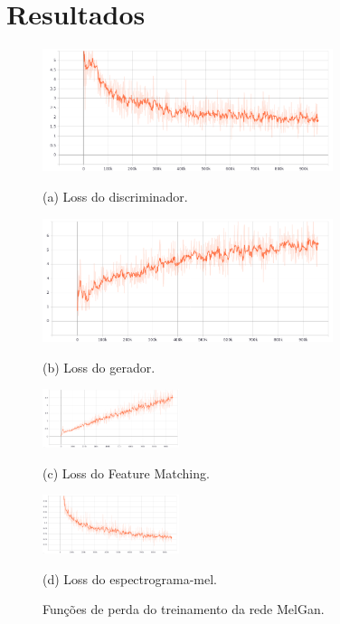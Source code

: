 \documentclass{article}
\begin{document}
\section{Resultados}
\label{sec:pagestyle}

\begin{figure}[H]
	
	\begin{minipage}[b]{1.0\linewidth}
		\centering
		\centerline{\includegraphics[width=8.5cm]{Figures/discriminator_loss.png}}
		\centerline{(a) Loss do discriminador.}\medskip
	\end{minipage}
	\begin{minipage}[b]{1\linewidth}
		\centering
		\centerline{\includegraphics[width=8.5cm]{Figures/generator_loss.png}}
		\centerline{(b) Loss do gerador.}\medskip
	\end{minipage}
	
	\begin{minipage}[b]{.48\linewidth}
		\centering
		\centerline{\includegraphics[width=4.0cm]{Figures/feature_matching.png}}
		\centerline{(c) Loss do Feature Matching.}\medskip
	\end{minipage}
	\hfill
	\begin{minipage}[b]{0.48\linewidth}
		\centering
		\centerline{\includegraphics[width=4.0cm]{Figures/mel_reconstruction.png}}
		\centerline{(d) Loss do espectrograma-mel.}\medskip
	\end{minipage}
	\caption{Funções de perda do treinamento da rede MelGan.}
	\label{fig:res}
\end{figure}
\end{document}
